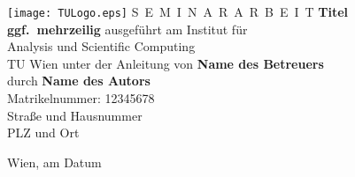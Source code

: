\documentclass[a4paper,11pt,bibliography=totoc,listof=totoc,headinclude=true,cleardoublepage=empty,oneside]{scrbook}
\begin{document}


\begin{titlepage}
  \begin{center}
    \texttt{[image: TULogo.eps]}
    \vskip 1cm%
    {\LARGE S~\Large E~M~I~N~A~R~A~R~B~E~I~T}
    \vskip 8mm
    {\huge\bfseries\color{change}Titel \\[1ex] ggf.\ mehrzeilig}
    \vskip 1cm
    \large 
    ausgef\"uhrt am    
    \vskip 0.75cm
    {\Large Institut f\"ur\\[1ex] Analysis und Scientific Computing}\\[1ex]
    {\Large TU Wien}
    \vskip0.75cm
    unter der Anleitung von
    \vskip0.75cm
    {\Large\bfseries\color{change}Name des Betreuers}\\[1ex]
    \vskip 0.5cm
    durch
    \vskip 0.5cm
    {\Large\bfseries\color{change}Name des Autors}\\[1ex]
    Matrikelnummer: {\color{change}12345678}\\[1ex]
    {\color{change}Straße und Hausnummer}\\[1ex]
    {\color{change}PLZ und Ort}
  \end{center}
  
  \vfill
  
  \small
  Wien, am {\color{change} Datum} %
  \vspace*{-15mm}
\end{titlepage}

\cleardoublepage



\tableofcontents

\cleardoublepage
{} 

\end{document}

